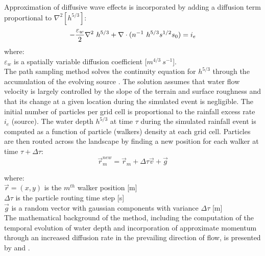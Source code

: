 \documentclass[gmd, manuscript]{copernicus}
\begin{document}
\noindent
Approximation of diffusive wave effects is incorporated by adding a diffusion term proportional to
$ \nabla^2 [h^{5/3}]$:
\begin{equation}
\label{eq:difwater}
-{\varepsilon_w\over 2 }\nabla^2 ~ h^{5/3}
+\nabla \cdot (n^{-1}~h^{5/3}s^{1/2}\vec{s_0}) = i_e
\end{equation}
{\small
\noindent
 where: \\
 \noindent
 \hspace*{0.5em} $\varepsilon_w$ is a spatially variable diffusion coefficient [$\unit{m}^{4/3}~\unit{s}^{-1}$]. \\
}
The path sampling method solves the continuity equation for $h^{5/3}$ 
through the accumulation of the evolving source \citep{Mitasova2004}.
The solution assumes that water flow velocity 
is largely controlled by the slope of the terrain and surface roughness 
and that its change at a given location during the simulated event is negligible. 
The initial number of particles per grid cell is proportional to the rainfall excess rate $i_e$ (source).
The water depth $h^{5/3}$ at time $\tau$ during the simulated rainfall event
 is computed as a function of particle (walkers) density at each grid cell. 
Particles are then routed across the landscape 
by finding a new position for each walker at time $\tau + \Delta \tau$:
\begin{equation}
\vec{r}_m^{new}=\vec{r}_m + \Delta \tau \vec{v} + \vec{g}
\end{equation}

{\small
\noindent
where: \\
\noindent
\hspace*{0.5em} $\vec{r} = (x, y)$ is the $m^{th}$ walker position [\unit{m}]\\
\hspace*{0.5em} $\Delta \tau$ is the particle routing time step [\unit{s}]\\
\hspace*{0.5em} $\vec{g}$ is a random vector with gaussian components with variance $\Delta \tau$ [\unit{m}]\\
}
%
\noindent
The mathematical background of the method, including the computation 
of the temporal evolution of water depth
and incorporation of approximate momentum 
through an increased diffusion rate in the prevailing direction of flow,
is presented by \cite{Mitas1998} and \cite{Mitasova2004}.
\end{document}
